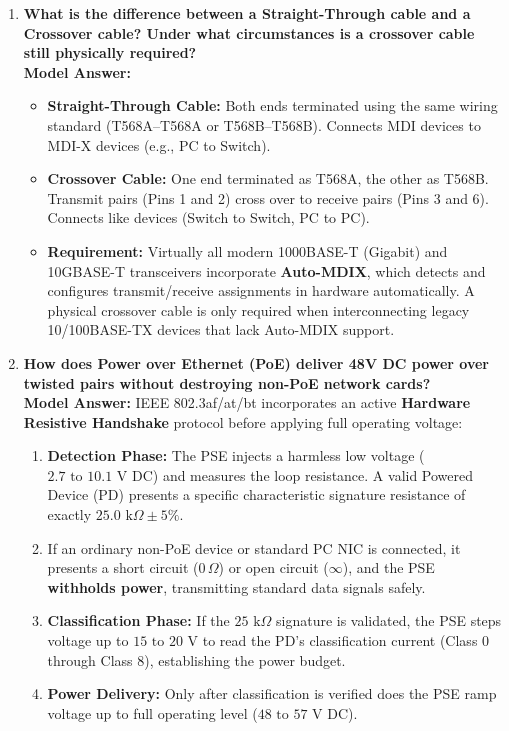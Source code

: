 \begin{enumerate}[leftmargin=*,label=\textbf{Q\arabic*.}]
    \item \textbf{What is the difference between a Straight-Through cable and a Crossover cable? Under what circumstances is a crossover cable still physically required?} \\
    \textbf{Model Answer:}
    \begin{itemize}
        \item \textbf{Straight-Through Cable:} Both ends terminated using the same wiring standard (T568A--T568A or T568B--T568B). Connects MDI devices to MDI-X devices (e.g., PC to Switch).
        \item \textbf{Crossover Cable:} One end terminated as T568A, the other as T568B. Transmit pairs (Pins 1 and 2) cross over to receive pairs (Pins 3 and 6). Connects like devices (Switch to Switch, PC to PC).
        \item \textbf{Requirement:} Virtually all modern 1000BASE-T (Gigabit) and 10GBASE-T transceivers incorporate \textbf{Auto-MDIX}, which detects and configures transmit/receive assignments in hardware automatically. A physical crossover cable is only required when interconnecting legacy 10/100BASE-TX devices that lack Auto-MDIX support.
    \end{itemize}

    \item \textbf{How does Power over Ethernet (PoE) deliver 48V DC power over twisted pairs without destroying non-PoE network cards?} \\
    \textbf{Model Answer:} IEEE 802.3af/at/bt incorporates an active \textbf{Hardware Resistive Handshake} protocol before applying full operating voltage:
    \begin{enumerate}
        \item \textbf{Detection Phase:} The PSE injects a harmless low voltage ($2.7\text{ to }10.1\text{ V DC}$) and measures the loop resistance. A valid Powered Device (PD) presents a specific characteristic signature resistance of exactly \textbf{$25.0\text{ k}\Omega \pm 5\%$}.
        \item If an ordinary non-PoE device or standard PC NIC is connected, it presents a short circuit ($0\,\Omega$) or open circuit ($\infty$), and the PSE \textbf{withholds power}, transmitting standard data signals safely.
        \item \textbf{Classification Phase:} If the $25\text{ k}\Omega$ signature is validated, the PSE steps voltage up to $15\text{ to }20\text{ V}$ to read the PD's classification current (Class 0 through Class 8), establishing the power budget.
        \item \textbf{Power Delivery:} Only after classification is verified does the PSE ramp voltage up to full operating level ($48\text{ to }57\text{ V DC}$).
    \end{enumerate}


\end{enumerate}
